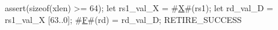 assert(sizeof(xlen) >= 64);
let rs1_val_X            = #\hyperref[sailRISCVzX]{X}#(rs1);
let rd_val_D             = rs1_val_X [63..0];
#\hyperref[sailRISCVzF]{F}#(rd) = rd_val_D;
RETIRE_SUCCESS
